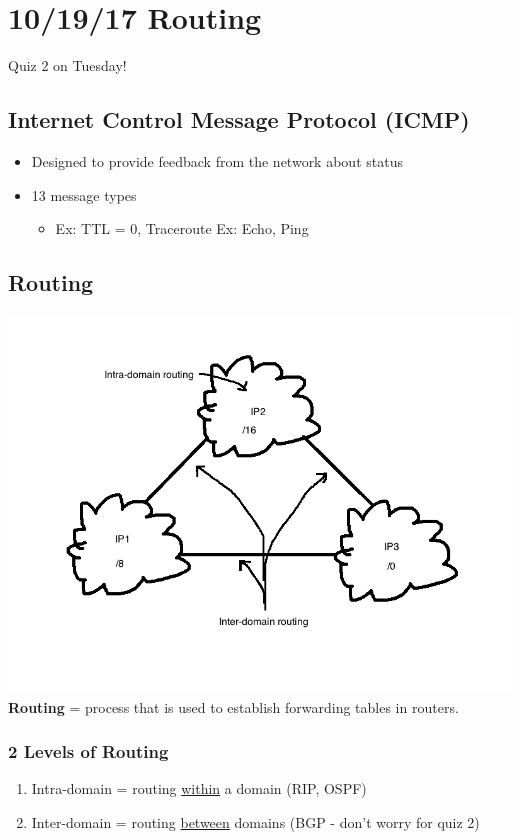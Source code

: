\documentclass[11pt]{article}
\begin{document}
\section{10/19/17  Routing}
\label{sec:orgheadline76}
Quiz 2 on Tuesday!

\subsection{Internet Control Message Protocol (ICMP)}
\label{sec:orgheadline68}
\begin{itemize}
\item Designed to provide feedback from the network about status
\item 13 message types
\begin{itemize}
\item Ex: TTL = 0, Traceroute
Ex: Echo, Ping
\end{itemize}
\end{itemize}

\subsection{Routing}
\label{sec:orgheadline75}
\includegraphics[width=.9\linewidth]{diagrams/routing.png}
\textbf{Routing} = process that is used to establish forwarding tables in
routers.
\subsubsection{2 Levels of Routing}
\label{sec:orgheadline69}
\begin{enumerate}
\item Intra-domain = routing \uline{within} a domain (RIP, OSPF)
\item Inter-domain = routing \uline{between} domains (BGP - don't worry for
quiz 2)
\end{enumerate}
\end{document}
